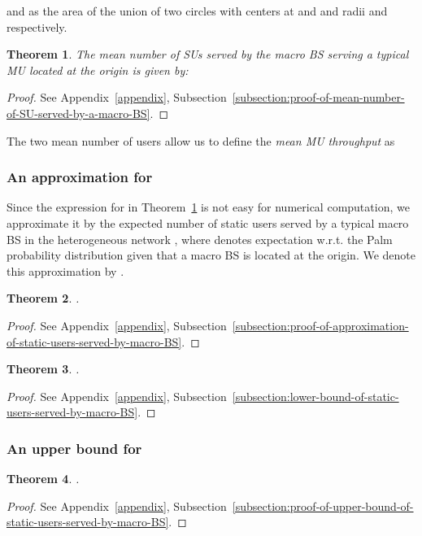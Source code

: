 \documentclass[10pt,journal]{IEEEtran}
\newtheorem{theorem}{Theorem}
\begin{document}
and
 as the area of the union of two circles 
 with centers at  and  and radii
  and  respectively.  
\begin{theorem}\label{theorem:mean-number-of-SU-served-by-a-macro-BS}
The mean number of SUs served by the macro BS serving a typical MU located at the origin is given by:  

\end{theorem}
\begin{proof}
 See Appendix~\ref{appendix}, Subsection~\ref{subsection:proof-of-mean-number-of-SU-served-by-a-macro-BS}.
\end{proof}

The two mean number of users allow us to define the {\em mean MU
  throughput}  as


\subsubsection{An approximation for }
\label{subsubsection:approximation-for-mean-number-of-static-users-co-served-with-the-typical-mobile-user}
Since the expression for  in Theorem~\ref{theorem:mean-number-of-SU-served-by-a-macro-BS} 
is not easy for 
numerical computation, we approximate it by the expected number of static users served by a typical macro BS in the 
heterogeneous network , where 
 denotes expectation w.r.t. the Palm probability distribution  
given that a macro BS is located at the origin. 
We denote this approximation by .

\begin{theorem}\label{theorem:approximation-of-static-users-served-by-macro-BS}
 .
\end{theorem}
\begin{proof}
 See Appendix~\ref{appendix}, 
 Subsection~\ref{subsection:proof-of-approximation-of-static-users-served-by-macro-BS}.
\end{proof}


\begin{theorem}\label{theorem:lower-bound-of-static-users-served-by-macro-BS}
 .
\end{theorem}
\begin{proof}
 See Appendix~\ref{appendix}, 
 Subsection~\ref{subsection:lower-bound-of-static-users-served-by-macro-BS}.
\end{proof}


\subsubsection{An upper bound for }
\label{subsubsection:upper-bound-for-mean-number-of-static-users-co-served-with-the-typical-mobile-user}
\begin{theorem}\label{theorem:upper-bound-of-static-users-served-by-macro-BS}
 .
\end{theorem}
\begin{proof}
See Appendix~\ref{appendix}, Subsection~\ref{subsection:proof-of-upper-bound-of-static-users-served-by-macro-BS}.
\end{proof}
\end{document}
